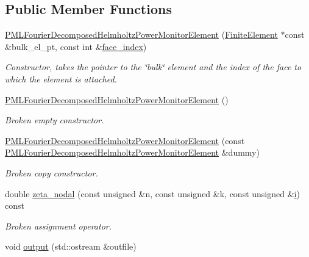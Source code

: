 \subsection*{Public Member Functions}
\begin{DoxyCompactItemize}
\item 
\hyperlink{classoomph_1_1PMLFourierDecomposedHelmholtzPowerMonitorElement_afb1b5ec8389be0f36aeb1c6e5b41453c}{P\+M\+L\+Fourier\+Decomposed\+Helmholtz\+Power\+Monitor\+Element} (\hyperlink{classoomph_1_1FiniteElement}{Finite\+Element} $\ast$const \&bulk\+\_\+el\+\_\+pt, const int \&\hyperlink{classoomph_1_1FaceElement_a478d577ac6db67ecc80f1f02ae3ab170}{face\+\_\+index})
\begin{DoxyCompactList}\small\item\em Constructor, takes the pointer to the \char`\"{}bulk\char`\"{} element and the index of the face to which the element is attached. \end{DoxyCompactList}\item 
\hyperlink{classoomph_1_1PMLFourierDecomposedHelmholtzPowerMonitorElement_a21abbcb51942dec4b8458c31045dc644}{P\+M\+L\+Fourier\+Decomposed\+Helmholtz\+Power\+Monitor\+Element} ()
\begin{DoxyCompactList}\small\item\em Broken empty constructor. \end{DoxyCompactList}\item 
\hyperlink{classoomph_1_1PMLFourierDecomposedHelmholtzPowerMonitorElement_a3b31144a461294982bfe1d35ed658eda}{P\+M\+L\+Fourier\+Decomposed\+Helmholtz\+Power\+Monitor\+Element} (const \hyperlink{classoomph_1_1PMLFourierDecomposedHelmholtzPowerMonitorElement}{P\+M\+L\+Fourier\+Decomposed\+Helmholtz\+Power\+Monitor\+Element} \&dummy)
\begin{DoxyCompactList}\small\item\em Broken copy constructor. \end{DoxyCompactList}\item 
double \hyperlink{classoomph_1_1PMLFourierDecomposedHelmholtzPowerMonitorElement_a4618f13a3a0d53cc95a2f4951f7e40e9}{zeta\+\_\+nodal} (const unsigned \&n, const unsigned \&k, const unsigned \&\hyperlink{cfortran_8h_adb50e893b86b3e55e751a42eab3cba82}{i}) const
\begin{DoxyCompactList}\small\item\em Broken assignment operator. \end{DoxyCompactList}\item 
void \hyperlink{classoomph_1_1PMLFourierDecomposedHelmholtzPowerMonitorElement_ab8ef8d59a746a0920304ef97edd1bc34}{output} (std\+::ostream \&outfile)

\end{DoxyCompactItemize}

